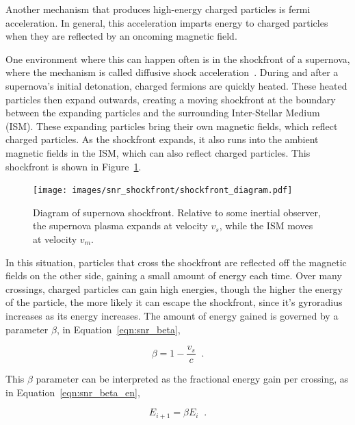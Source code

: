   Another mechanism that produces high-energy charged particles is fermi acceleration\cite{fermi1949,highenergyelectron_snr}.
  In general, this acceleration imparts energy to charged particles when they are reflected by an oncoming magnetic field.
  
  One environment where this can happen often is in the shockfront of a supernova, where the mechanism is called diffusive shock acceleration~\cite{dsa1,dsa2,dsa3,dsa4,dsa5}.
  During and after a supernova's initial detonation, charged fermions are quickly heated.
  These heated particles then expand outwards, creating a moving shockfront at the boundary between the expanding particles and the surrounding Inter-Stellar Medium (ISM).
  These expanding particles bring their own magnetic fields, which reflect charged particles.
  As the shockfront expands, it also runs into the ambient magnetic fields in the ISM, which can also reflect charged particles.
  This shockfront is shown in Figure~\ref{fig:snr_shockfront}.

  \begin{figure}[ht]
    \centering
    \texttt{[image: images/snr\_shockfront/shockfront\_diagram.pdf]}
    \caption[Supernova Shockfront]{
      Diagram of supernova shockfront.
      Relative to some inertial observer, the supernova plasma expands at velocity $v_s$, while the ISM moves at velocity $v_m$.
    }
    \label{fig:snr_shockfront}
  \end{figure}
  
  In this situation, particles that cross the shockfront are reflected off the magnetic fields on the other side, gaining a small amount of energy each time.
  Over many crossings, charged particles can gain high energies, though the higher the energy of the particle, the more likely it can escape the shockfront, since it's gyroradius increases as its energy increases.
  The amount of energy gained is governed by a parameter $\beta$, in Equation~\ref{eqn:snr_beta}, 
  
  \begin{equation}\label{eqn:snr_beta}
    \beta = 1 - \frac{v_s}{c} \;\; .
  \end{equation}
  
  This $\beta$ parameter can be interpreted as the fractional energy gain per crossing, as in Equation~\ref{eqn:snr_beta_en},

  \begin{equation}\label{eqn:snr_beta_en}
    E_{i+1} = \beta E_{i} \;\; .
  \end{equation}
  
